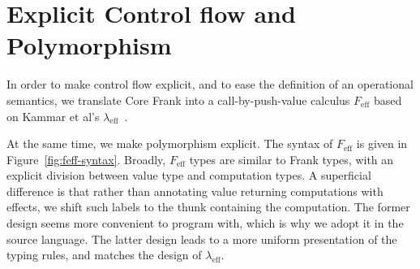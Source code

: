 \documentclass[preprint]{sigplanconf}
\newcommand{\lameff}{$\lambda_\mathrm{eff}$\xspace}
\newcommand{\feff}{$F_\textrm{eff}$\xspace}
\begin{document}
\section{Explicit Control flow and Polymorphism}
\label{sec:feff}

In order to make control flow explicit, and to ease the definition of
an operational semantics, we translate Core Frank into a
call-by-push-value calculus \feff based on Kammar et al's
\lameff~\cite{KammarLO13}.

At the same time, we make polymorphism explicit. The syntax of \feff
is given in Figure~\ref{fig:feff-syntax}. Broadly, \feff types are
similar to Frank types, with an explicit division between value type
and computation types. A superficial difference is that rather than
annotating value returning computations with effects, we shift such
labels to the thunk containing the computation. The former design
seems more convenient to program with, which is why we adopt it in the
source language. The latter design leads to a more uniform
presentation of the typing rules, and matches the design of \lameff.
%
\end{document}
